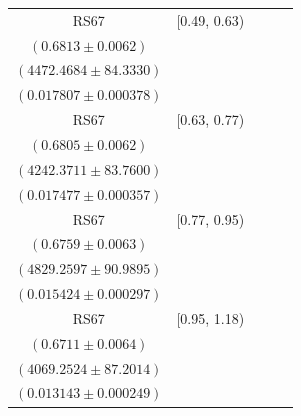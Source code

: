 {\begin{longtable}{|c|c|c|c|c|}
RS67 & [0.49, 0.63) & \begin{tabular}{@{}c@{}}$0.7356 \pm 0.0044$ \\ $(0.6813 \pm 0.0062)$\end{tabular} & \begin{tabular}{@{}c@{}}$4053.8929 \pm 77.2620$ \\ $(4472.4684 \pm 84.3330)$\end{tabular} & \begin{tabular}{@{}c@{}}$0.017840 \pm 0.000378$ \\ $(0.017807 \pm 0.000378)$\end{tabular} \\ \hline
RS67 & [0.63, 0.77) & \begin{tabular}{@{}c@{}}$0.7347 \pm 0.0045$ \\ $(0.6805 \pm 0.0062)$\end{tabular} & \begin{tabular}{@{}c@{}}$3853.3000 \pm 76.7429$ \\ $(4242.3711 \pm 83.7600)$\end{tabular} & \begin{tabular}{@{}c@{}}$0.016834 \pm 0.000354$ \\ $(0.017477 \pm 0.000357)$\end{tabular} \\ \hline
RS67 & [0.77, 0.95) & \begin{tabular}{@{}c@{}}$0.7287 \pm 0.0045$ \\ $(0.6759 \pm 0.0063)$\end{tabular} & \begin{tabular}{@{}c@{}}$4398.3809 \pm 83.4655$ \\ $(4829.2597 \pm 90.9895)$\end{tabular} & \begin{tabular}{@{}c@{}}$0.015321 \pm 0.000296$ \\ $(0.015424 \pm 0.000297)$\end{tabular} \\ \hline
RS67 & [0.95, 1.18) & \begin{tabular}{@{}c@{}}$0.7229 \pm 0.0047$ \\ $(0.6711 \pm 0.0064)$\end{tabular} & \begin{tabular}{@{}c@{}}$3719.5086 \pm 80.3108$ \\ $(4069.2524 \pm 87.2014)$\end{tabular} & \begin{tabular}{@{}c@{}}$0.013341 \pm 0.000255$ \\ $(0.013143 \pm 0.000249)$\end{tabular} \\ \hline

\end{longtable}}
